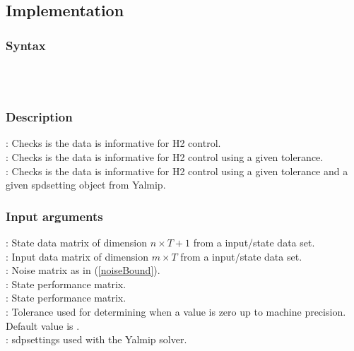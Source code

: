 \subsection{Implementation}
\subsubsection*{Syntax} 
 \\
 \\

\subsubsection*{Description} 
: Checks is the data is informative for \mbox{H2} control. \\
: Checks is the data is informative for \mbox{H2} control using a given tolerance. \\
: Checks is the data is informative for \mbox{H2} control using a given tolerance and a given spdsetting object from Yalmip.

\subsubsection*{Input arguments}
\textbf{}: State data matrix of dimension $n \times T+1$ from a input/state data set.\\
\textbf{}: Input data matrix of dimension $m \times T$ from a input/state data set.\\
\textbf{}: Noise matrix as in (\ref{noiseBound}). \\ 
\textbf{}: State performance matrix. \\ 
\textbf{}: State performance matrix. \\ 
\textbf{}: Tolerance used for determining when a value is zero up to machine precision. Default value is .\\
\textbf{}: sdpsettings used with the Yalmip solver.

